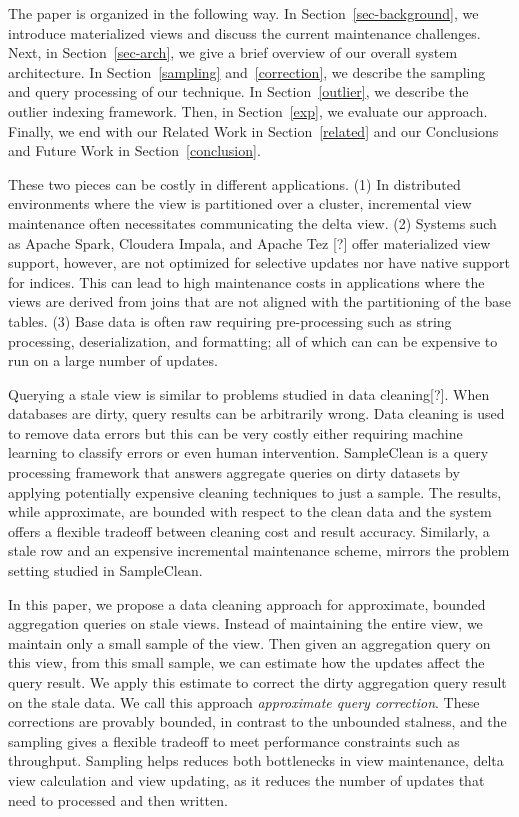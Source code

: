 The paper is organized in the following way. 
In Section~\ref{sec-background}, we introduce materialized views and discuss the current maintenance challenges.
Next, in Section~\ref{sec-arch}, we give a brief overview of our overall system architecture.
In Section~\ref{sampling} and~\ref{correction}, we describe the sampling and query processing of our technique.
In Section~\ref{outlier}, we describe the outlier indexing framework.
Then, in Section~\ref{exp}, we evaluate our approach.
Finally, we end with our Related Work in Section~\ref{related} and our Conclusions and Future Work in Section~\ref{conclusion}.

\iffalse
 These two pieces can be costly in different
applications. (1) In distributed environments where the view is partitioned
over a cluster, incremental view maintenance often necessitates communicating
the delta view. (2) Systems such as Apache Spark, Cloudera Impala,
and Apache Tez {[}?{]} offer materialized view support, however, are
not optimized for selective updates nor have native support for indices.
This can lead to high maintenance costs in applications where the
views are derived from joins that are not aligned with the partitioning
of the base tables. (3) Base data is often raw requiring pre-processing
such as string processing, deserialization, and formatting; all of
which can can be expensive to run on a large number of updates. 



Querying a stale view is similar to problems studied in data cleaning{[}?{]}.
When databases are dirty, query results can be arbitrarily wrong.
Data cleaning is used to remove data errors but this can be very costly either 
requiring machine learning to classify errors or even human intervention.
SampleClean is a query processing framework that answers aggregate
queries on dirty datasets by applying potentially expensive cleaning
techniques to just a sample. The results, while approximate, are bounded
with respect to the clean data and the system offers a flexible tradeoff
between cleaning cost and result accuracy. Similarly, a stale row
and an expensive incremental maintenance scheme, mirrors the problem
setting studied in SampleClean. 

In this paper, we propose a data cleaning approach for approximate,
bounded aggregation queries on stale views. Instead of maintaining
the entire view, we maintain only a small sample of the view. Then
given an aggregation query on this view, from this small sample, we
can estimate how the updates affect the query result. We apply this
estimate to correct the dirty aggregation query result on the stale
data. We call this approach \emph{approximate query correction}. 
These corrections are provably bounded, in contrast to the unbounded stalness,
and the sampling gives a flexible tradeoff to meet performance constraints such as throughput.
Sampling helps reduces both bottlenecks in view maintenance, delta
view calculation and view updating, as it reduces the number of updates
that need to processed and then written.

